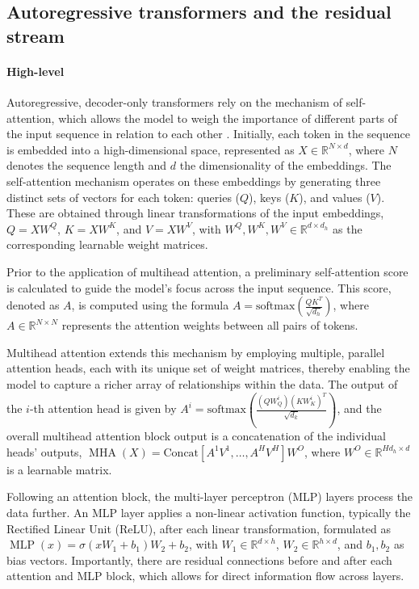 \documentclass[11pt]{scrartcl}
\begin{document}
\subsection{Autoregressive transformers and the residual stream}

\paragraph{High-level}

Autoregressive, decoder-only transformers rely on the mechanism of self-attention, which allows the model to weigh the importance of different parts of the input sequence in relation to each other \citep{vaswani2017attention}. Initially, each token in the sequence is embedded into a high-dimensional space, represented as \(X \in \mathbb{R}^{N \times d}\), where \(N\) denotes the sequence length and \(d\) the dimensionality of the embeddings. The self-attention mechanism operates on these embeddings by generating three distinct sets of vectors for each token: queries (\(Q\)), keys (\(K\)), and values (\(V\)). These are obtained through linear transformations of the input embeddings, \(Q = XW^Q\), \(K = XW^K\), and \(V = XW^V\), with \(W^Q, W^K, W^V \in \mathbb{R}^{d \times d_h}\) as the corresponding learnable weight matrices.

Prior to the application of multihead attention, a preliminary self-attention score is calculated to guide the model's focus across the input sequence. This score, denoted as \(A\), is computed using the formula \(A = \text{softmax}\left(\frac{QK^T}{\sqrt{d_h}}\right)\), where \(A \in \mathbb{R}^{N \times N}\) represents the attention weights between all pairs of tokens.

Multihead attention extends this mechanism by employing multiple, parallel attention heads, each with its unique set of weight matrices, thereby enabling the model to capture a richer array of relationships within the data. The output of the \(i\)-th attention head is given by \(A^i = \text{softmax}\left(\frac{(QW_Q^i)(KW_K^i)^T}{\sqrt{d_k}}\right)\), and the overall multihead attention block output is a concatenation of the individual heads' outputs, \( \operatorname{MHA}(X) = \text{Concat}\left[A^1V^1, \ldots, A^HV^H\right]W^O \), where \(W^O \in \mathbb{R}^{Hd_h \times d}\) is a learnable matrix.

Following an attention block, the multi-layer perceptron (MLP) layers process the data further. An MLP layer applies a non-linear activation function, typically the Rectified Linear Unit (ReLU), after each linear transformation, formulated as \(\operatorname{MLP}(x) = \sigma(xW_1 + b_1)W_2 + b_2\), with \(W_1 \in \mathbb{R}^{d \times h}\), \(W_2 \in \mathbb{R}^{h \times d}\), and \(b_1, b_2\) as bias vectors. Importantly, there are residual connections before and after each attention and MLP block, which allows for direct information flow across layers. 
\end{document}
